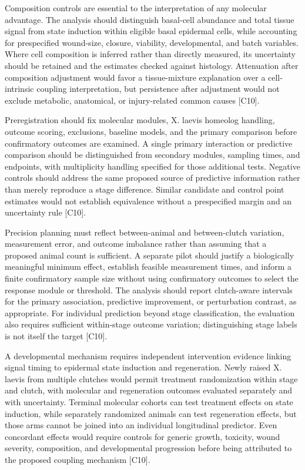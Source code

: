 \documentclass[11pt]{article}
\begin{document}
Composition controls are essential to the interpretation of any molecular advantage. The analysis should distinguish basal-cell abundance and total tissue signal from state induction within eligible basal epidermal cells, while accounting for prespecified wound-size, closure, viability, developmental, and batch variables. Where cell composition is inferred rather than directly measured, its uncertainty should be retained and the estimates checked against histology. Attenuation after composition adjustment would favor a tissue-mixture explanation over a cell-intrinsic coupling interpretation, but persistence after adjustment would not exclude metabolic, anatomical, or injury-related common causes [C10].

Preregistration should fix molecular modules, X. laevis homeolog handling, outcome scoring, exclusions, baseline models, and the primary comparison before confirmatory outcomes are examined. A single primary interaction or predictive comparison should be distinguished from secondary modules, sampling times, and endpoints, with multiplicity handling specified for those additional tests. Negative controls should address the same proposed source of predictive information rather than merely reproduce a stage difference. Similar candidate and control point estimates would not establish equivalence without a prespecified margin and an uncertainty rule [C10].

Precision planning must reflect between-animal and between-clutch variation, measurement error, and outcome imbalance rather than assuming that a proposed animal count is sufficient. A separate pilot should justify a biologically meaningful minimum effect, establish feasible measurement times, and inform a finite confirmatory sample size without using confirmatory outcomes to select the response module or threshold. The analysis should report clutch-aware intervals for the primary association, predictive improvement, or perturbation contrast, as appropriate. For individual prediction beyond stage classification, the evaluation also requires sufficient within-stage outcome variation; distinguishing stage labels is not itself the target [C10].

A developmental mechanism requires independent intervention evidence linking signal timing to epidermal state induction and regeneration. Newly raised X. laevis from multiple clutches would permit treatment randomization within stage and clutch, with molecular and regeneration outcomes evaluated separately and with uncertainty. Terminal molecular cohorts can test treatment effects on state induction, while separately randomized animals can test regeneration effects, but those arms cannot be joined into an individual longitudinal predictor. Even concordant effects would require controls for generic growth, toxicity, wound severity, composition, and developmental progression before being attributed to the proposed coupling mechanism [C10].
\end{document}
